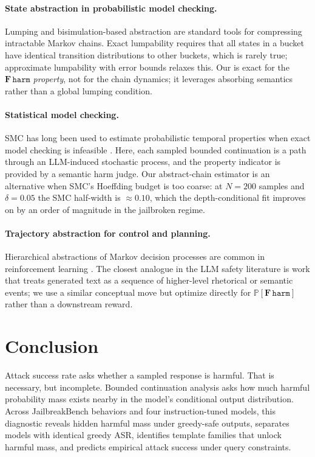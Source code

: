 \documentclass[11pt]{article}
\newcommand{\Prob}{\mathbb{P}}
\newcommand{\harm}{\texttt{harm}}
\newcommand{\ASR}{\textsc{ASR}}
\newcommand{\SMC}{\textsc{SMC}}
\begin{document}
\paragraph{State abstraction in probabilistic model checking.}
Lumping and bisimulation-based abstraction \cite{baier2008principles} are standard tools for compressing intractable Markov chains.  Exact lumpability requires that all states in a bucket have identical transition distributions to other buckets, which is rarely true; approximate lumpability with error bounds \cite{buchholz1994exact} relaxes this.  Our  is exact for the $\mathbf{F}\,\harm$ \emph{property}, not for the chain dynamics; it leverages absorbing semantics rather than a global lumping condition.

\paragraph{Statistical model checking.}
SMC has long been used to estimate probabilistic temporal properties when exact model checking is infeasible \cite{younes2002probabilistic,legay2010statistical}.  Here, each sampled bounded continuation is a path through an LLM-induced stochastic process, and the property indicator is provided by a semantic harm judge.  Our abstract-chain estimator is an alternative when \SMC's Hoeffding budget is too coarse: at $N=200$ samples and $\delta=0.05$ the \SMC{} half-width is $\approx 0.10$, which the depth-conditional fit improves on by an order of magnitude in the jailbroken regime.

\paragraph{Trajectory abstraction for control and planning.}
Hierarchical abstractions of Markov decision processes are common in reinforcement learning \cite{sutton1999between}.  The closest analogue in the LLM safety literature is work that treats generated text as a sequence of higher-level rhetorical or semantic events; we use a similar conceptual move but optimize directly for $\Prob[\mathbf{F}\,\harm]$ rather than a downstream reward.

\section{Conclusion}
\label{sec:conclusion}

Attack success rate asks whether a sampled response is harmful.  That is necessary, but incomplete.  Bounded continuation analysis asks how much harmful probability mass exists nearby in the model's conditional output distribution.  Across JailbreakBench behaviors and four instruction-tuned models, this diagnostic reveals hidden harmful mass under greedy-safe outputs, separates models with identical greedy \ASR, identifies template families that unlock harmful mass, and predicts empirical attack success under query constraints.
\end{document}
